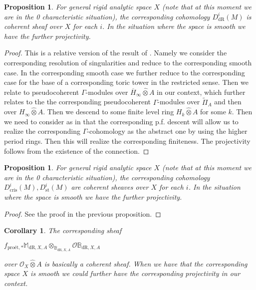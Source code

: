 \documentclass[12pt]{amsart}
\newtheorem{proposition}[theorem]{Proposition}
\newtheorem{corollary}[theorem]{Corollary}
\theoremstyle{definition}
\numberwithin{equation}{section}
\begin{document}
\begin{proposition} \label{proposition4.42}
For general rigid analytic space $X$ (note that at this moment we are in the 0 characteristic situation), the corresponding cohomology $D^i_\mathrm{dR}(M)$ is coherent sheaf over $X$ for each $i$. In the situation where the space is smooth we have the further projectivity. 
\end{proposition}
	

\begin{proof}
This is a relative version of the result of \cite[below Definition 10.10]{KL3}. Namely we consider the corresponding resolution of singularities and reduce to the corresponding smooth case. In the corresponding smooth case we further reduce to the corresponding case for the base of a corresponding toric tower in the restricted sense. Then we relate to pseudocoherent $\Gamma$-modules over $\overline{H}_\infty\widehat{\otimes}A$ in our context, which further relates to the the corresponding pseudocoherent $\Gamma$-modules over $\widetilde{\Pi}_A$ and then over $H_\infty\widehat{\otimes}A$. Then we descend to some finite level ring $H_k\widehat{\otimes}A$ for some $k$. Then we need to consider as in \cite[Corollary 5.9.5]{KL16} that the corresponding p.f. descent will allow us to realize the corresponding $\Gamma$-cohomology as the abstract one by using the higher period rings. Then this will realize the corresponding finiteness. The projectivity follows from the existence of the connection.
\end{proof}


\begin{proposition}
For general rigid analytic space $X$ (note that at this moment we are in the 0 characteristic situation), the corresponding cohomology $D^i_\mathrm{cris}(M),D^i_\mathrm{st}(M)$ are coherent sheaves over $X$ for each $i$. In the situation where the space is smooth we have the further projectivity.	
\end{proposition}
	

\begin{proof}
See the proof in the previous proposition.
\end{proof}





\begin{corollary}
The corresponding sheaf
\begin{center}
 $f_{\text{pro\'et},*} \mathbb{M}_{\mathrm{dR},X,A}\otimes_{\mathbb{B}_{\mathrm{dR},X,A}}	 \mathcal{O}\mathbb{B}_{\mathrm{dR},X,A}$\end{center}
over $\mathcal{O}_X\widehat{\otimes}A$ is basically a coherent sheaf.	When we have that the corresponding space $X$ is smooth we could further have the corresponding projectivity in our context.  
\end{corollary}
 
\end{document}
